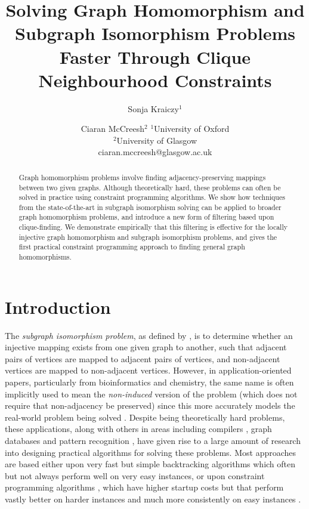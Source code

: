 \documentclass{article}
\title{Solving Graph Homomorphism and Subgraph Isomorphism Problems Faster Through Clique Neighbourhood Constraints}
\author{
Sonja Kraiczy$^1$
\and
Ciaran McCreesh$^2$
\affiliations
$^1$University of Oxford\\
$^2$University of Glasgow\\
\emails
ciaran.mccreesh@glasgow.ac.uk
}
\newcommand{\citet}[1]{\citeauthor{#1} \shortcite{#1}}
\begin{document}
\maketitle

\begin{abstract}
    Graph homomorphism problems involve finding adjacency-preserving mappings between two given
    graphs.  Although theoretically hard, these problems can often be solved in practice
    using constraint programming algorithms. We show how techniques from the state-of-the-art in
    subgraph isomorphism solving can be applied to broader graph homomorphism problems, and
    introduce a new form of filtering based upon clique-finding. We demonstrate empirically that
    this filtering is effective for the locally injective graph homomorphism and subgraph
    isomorphism problems, and gives the first practical constraint programming approach to
    finding general graph homomorphisms.
\end{abstract}

\section{Introduction}

The \emph{subgraph isomorphism problem}, as defined by \citet{DBLP:books/fm/GareyJ79}, is to
determine whether an injective mapping exists from one given graph to another, such that adjacent
pairs of vertices are mapped to adjacent pairs of vertices, and non-adjacent vertices are mapped to
non-adjacent vertices.  However, in application-oriented papers, particularly from bioinformatics
and chemistry, the same name is often implicitly used to mean the \emph{non-induced} version of the
problem (which does not require that non-adjacency be preserved) since this more accurately models
the real-world problem being solved \cite{Willett1999,EhrlichR11}. Despite being theoretically hard
problems, these applications, along with others in areas including compilers
\cite{DBLP:conf/cp/BlindellLCS15}, graph databases \cite{DBLP:journals/jair/McCreeshPST18} and
pattern recognition \cite{DBLP:journals/ijprai/FoggiaPV14}, have given rise to a large amount of
research into designing practical algorithms for solving these problems.  Most approaches are based
either upon very fast but simple backtracking algorithms
\cite{DBLP:journals/pami/CordellaFSV04,DBLP:journals/bmcbi/BonniciGPSF13,DBLP:conf/gbrpr/CarlettiFSV17}
which often but not always perform well on very easy instances, or upon constraint programming
algorithms
\cite{DBLP:journals/constraints/ZampelliDS10,DBLP:journals/ai/Solnon10,DBLP:conf/cp/AudemardLMGP14,DBLP:conf/cp/McCreeshP15,DBLP:conf/cpaior/ArchibaldDHMP019},
which have higher startup costs but that perform vastly better on harder instances and much more
consistently on easy instances \cite{DBLP:journals/jair/McCreeshPST18,DBLP:conf/gbrpr/Solnon19}.
\end{document}
